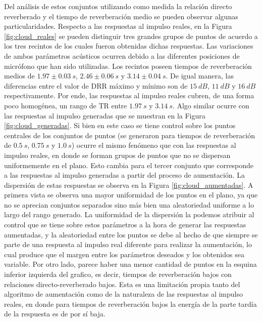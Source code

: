 Del análisis de estos conjuntos utilizando como medida la relación directo reverberado  y el tiempo de reverberación medio se pueden observar algunas particularidades. Respecto a las respuestas al impulso reales, en la Figura \ref{fig:cloud_reales} se pueden distinguir tres grandes grupos de puntos de acuerdo a los tres recintos de los cuales fueron obtenidas dichas respuestas. 
Las variaciones de ambos parámetros acústicos ocurren debido a las diferentes posiciones de micrófono que han sido utilizadas. Los recintos poseen tiempos de reverberación medios de $1.97 \pm 0.03 \ s$, $2.46 \pm 0.06 \ s$ y $3.14 \pm 0.04	\ s$. De igual manera, las diferencias entre el valor de DRR máximo y mínimo son de $15 \ dB$, $11 \ dB$ y $16 \ dB$ respectivamente. Por ende, las respuestas al impulso reales cubren, de una forma poco homogénea, un rango de TR entre $1.97 \ s$ y $3.14 \ s$. Algo similar ocurre con las respuestas al impulso generadas que se muestran en la Figura \ref{fig:cloud_generadas}. Si bien en este caso se tiene control sobre los puntos centrales de los conjuntos de puntos (se generaron para tiempos de reverberación de $0.5 \ s$, $0.75 \ s$ y $1.0 \ s$) ocurre el mismo fenómeno que con las respuestas al impulso reales, en donde se forman grupos de puntos que no se dispersan uniformemente en el plano. Esto cambia para el tercer conjunto que corresponde a las respuestas al impulso generadas a partir del proceso de aumentación. La dispersión de estas respuestas se observa en la Figura \ref{fig:cloud_aumentadas}. A primera vista se observa una mayor uniformidad de los puntos en el plano, ya que no se aprecian conjuntos separados sino más bien una aleatoriedad uniforme a lo largo del rango generado. La uniformidad de la dispersión la podemos atribuir al control que se tiene sobre estos parámetros a la hora de generar las respuestas aumentadas, y la aleatoriedad entre los puntos se debe al hecho de que siempre se parte de una respuesta al impulso real diferente para realizar la aumentación, lo cual produce que el margen entre los parámetros deseados y los obtenidos sea variable. Por otro lado, parece haber una menor cantidad de puntos en la esquina inferior izquierda del grafico, es decir, tiempos de reverberación bajos con relaciones directo-reverberado bajos. Esta es una limitación propia tanto del algoritmo de aumentación como de la naturaleza de las respuestas al impulso reales, en donde para tiempos de reverberación bajos la energía de la parte tardía de la respuesta es de por sí baja. 




